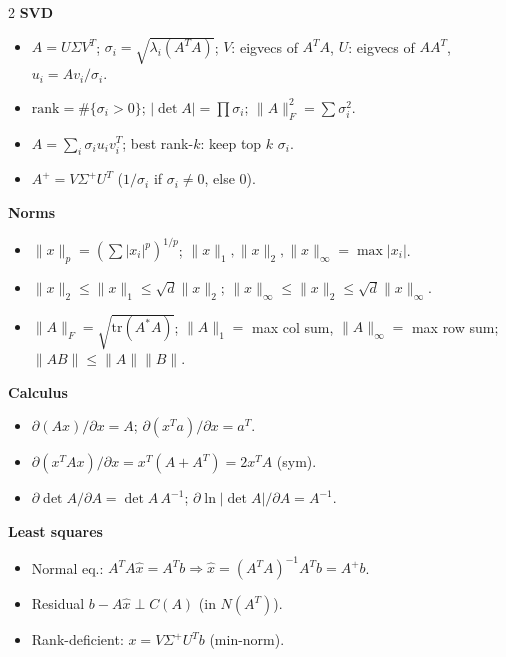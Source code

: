 \documentclass[hidelinks]{article}
\begin{document}
\begin{multicols}{2}
\textbf{\color{Thistle}SVD}
\begin{itemize}[leftmargin=1.1em,itemsep=1pt,topsep=1pt]
    \item $A=U\Sigma V^T$; $\sigma_i=\sqrt{\lambda_i(A^TA)}$; $V$: eigvecs of $A^TA$, $U$: eigvecs of $AA^T$, $u_i=Av_i/\sigma_i$.
    \item $\mathrm{rank}=\#\{\sigma_i>0\}$; $|\det A|=\prod\sigma_i$; $\|A\|_F^2=\sum\sigma_i^2$.
    \item $A=\sum_i\sigma_i u_iv_i^T$; best rank-$k$: keep top $k$ $\sigma_i$.
    \item $A^{+}=V\Sigma^{+}U^T$ ($1/\sigma_i$ if $\sigma_i\neq0$, else $0$).
\end{itemize}

\textbf{\color{Thistle}Norms}
\begin{itemize}[leftmargin=1.1em,itemsep=1pt,topsep=1pt]
    \item $\|x\|_p=(\sum|x_i|^p)^{1/p}$; $\|x\|_1,\|x\|_2,\|x\|_\infty=\max|x_i|$.
    \item $\|x\|_2\le\|x\|_1\le\sqrt d\|x\|_2$; $\|x\|_\infty\le\|x\|_2\le\sqrt d\|x\|_\infty$.
    \item $\|A\|_F=\sqrt{\mathrm{tr}(A^{*}A)}$; $\|A\|_1=$ max col sum, $\|A\|_\infty=$ max row sum; $\|AB\|\le\|A\|\|B\|$.
\end{itemize}

\textbf{\color{Thistle}Calculus}
\begin{itemize}[leftmargin=1.1em,itemsep=1pt,topsep=1pt]
    \item $\partial(Ax)/\partial x=A$; $\partial(x^Ta)/\partial x=a^T$.
    \item $\partial(x^TAx)/\partial x=x^T(A+A^T)=2x^TA$ (sym).
    \item $\partial\det A/\partial A=\det A\,A^{-1}$; $\partial\ln|\det A|/\partial A=A^{-1}$.
\end{itemize}

\textbf{\color{Thistle}Least squares}
\begin{itemize}[leftmargin=1.1em,itemsep=1pt,topsep=1pt]
    \item Normal eq.: $A^TA\hat x=A^Tb\Rightarrow\hat x=(A^TA)^{-1}A^Tb=A^{+}b$.
    \item Residual $b-A\hat x\perp C(A)$ (in $N(A^T)$).
    \item Rank-deficient: $x=V\Sigma^{+}U^Tb$ (min-norm).
\end{itemize}

\end{multicols}
\end{document}
